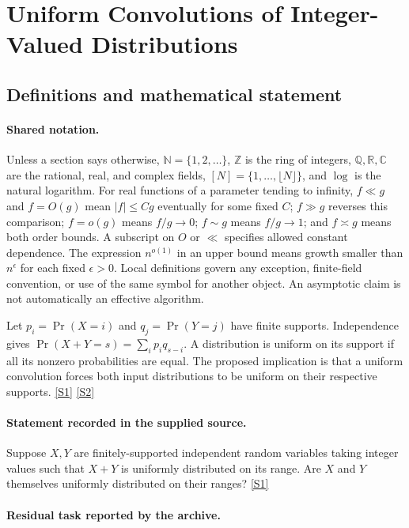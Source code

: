 \documentclass[11pt,a4paper]{article}
\newcommand{\N}{\mathbb{N}}
\newcommand{\Z}{\mathbb{Z}}
\newcommand{\Q}{\mathbb{Q}}
\newcommand{\R}{\mathbb{R}}
\newcommand{\C}{\mathbb{C}}
\newcommand{\sref}[2]{\hyperlink{source:#1:#2}{[S#2]}}
\begin{document}
\section{Uniform Convolutions of Integer-Valued Distributions}\label{statement}


\subsection{Definitions and mathematical statement}

\paragraph{Shared notation.}Unless a section says otherwise, $\N=\{1,2,\ldots\}$,
$\Z$ is the ring of integers, $\Q,\R,\C$ are the rational, real, and complex
fields, $[N]=\{1,\ldots,\lfloor N\rfloor\}$, and $\log$ is the natural
logarithm. For real functions of a parameter tending to infinity,
$f\ll g$ and $f=O(g)$ mean $|f|\leq Cg$ eventually for some fixed $C$;
$f\gg g$ reverses this comparison; $f=o(g)$ means $f/g\to0$;
$f\sim g$ means $f/g\to1$; and $f\asymp g$ means both order bounds.
A subscript on $O$ or $\ll$ specifies allowed constant dependence.
The expression $n^{o(1)}$ in an upper bound means growth smaller than
$n^\epsilon$ for each fixed $\epsilon>0$. Local definitions govern any
exception, finite-field convention, or use of the same symbol for another
object. An asymptotic claim is not automatically an effective algorithm.



Let $p_i=\Pr(X=i)$ and $q_j=\Pr(Y=j)$ have finite supports. Independence gives $\Pr(X+Y=s)=\sum_i p_iq_{s-i}$. A distribution is uniform on its support if all its nonzero probabilities are equal. The proposed implication is that a uniform convolution forces both input distributions to be uniform on their respective supports. \sref{statement}{1} \sref{statement}{2}

\paragraph{Statement recorded in the supplied source.}
Suppose $X, Y$ are finitely-supported independent random variables taking integer values such that $X + Y$ is uniformly distributed on its range. Are $X$ and $Y$ themselves uniformly distributed on their ranges? \sref{statement}{1}

\paragraph{Residual task reported by the archive.}
\end{document}
